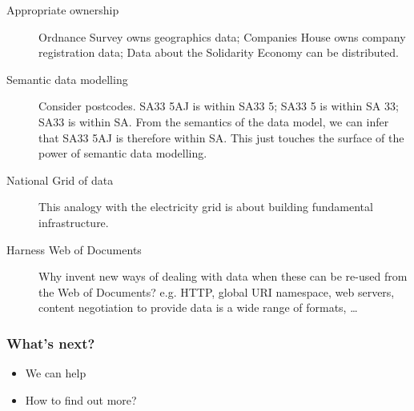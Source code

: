 \begin{description}
  \item[Appropriate ownership] Ordnance Survey owns geographics data; Companies House owns company registration data; Data about the Solidarity Economy can be distributed.
  \item[Semantic data modelling] \geek Consider postcodes. SA33 5AJ is within SA33 5; SA33 5 is within SA 33; SA33 is within SA. From the semantics of the data model, we can infer that SA33 5AJ is therefore within SA. This just touches the surface of the power of semantic data modelling.
  \item[National Grid of data] This analogy with the electricity grid is about building fundamental infrastructure.
  \item[Harness Web of Documents] \geek Why invent new ways of dealing with data when these can be re-used from the Web of Documents? e.g. HTTP, global URI namespace, web servers, content negotiation to provide data is a wide range of formats, \dots
\end{description}
\frame
{
  \frametitle{What's next?}
  \begin{itemize}
    \item We can help
    \item How to find out more?
  \end{itemize}
}



